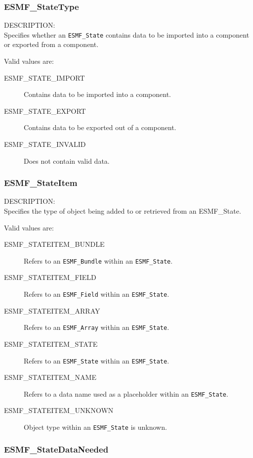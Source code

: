 
\subsubsection{ESMF\_StateType}

{\sf DESCRIPTION:\\}
Specifies whether an {\tt ESMF\_State} contains data to be imported
into a component or exported from a component. 

Valid values are:
\begin{description}
   \item [ESMF\_STATE\_IMPORT] 
         Contains data to be imported into a component.
   \item [ESMF\_STATE\_EXPORT]
         Contains data to be exported out of a component.
   \item [ESMF\_STATE\_INVALID]
         Does not contain valid data.
\end{description}

\subsubsection{ESMF\_StateItem}
\label{opt:stateitem}

{\sf DESCRIPTION:\\}
Specifies the type of object being added to or retrieved from an
{ESMF\_State.}

Valid values are:
\begin{description}
   \item [ESMF\_STATEITEM\_BUNDLE] 
         Refers to an {\tt ESMF\_Bundle} within an {\tt ESMF\_State}.
   \item [ESMF\_STATEITEM\_FIELD]
         Refers to an {\tt ESMF\_Field} within an {\tt ESMF\_State}.
   \item [ESMF\_STATEITEM\_ARRAY]
         Refers to an {\tt ESMF\_Array} within an {\tt ESMF\_State}.
   \item [ESMF\_STATEITEM\_STATE]
         Refers to an {\tt ESMF\_State} within an {\tt ESMF\_State}.
   \item [ESMF\_STATEITEM\_NAME]
         Refers to a data name used as a placeholder within 
         an {\tt ESMF\_State}.
   \item [ESMF\_STATEITEM\_UNKNOWN]
         Object type within an {\tt ESMF\_State} is unknown.
\end{description}

\subsubsection{ESMF\_StateDataNeeded}

